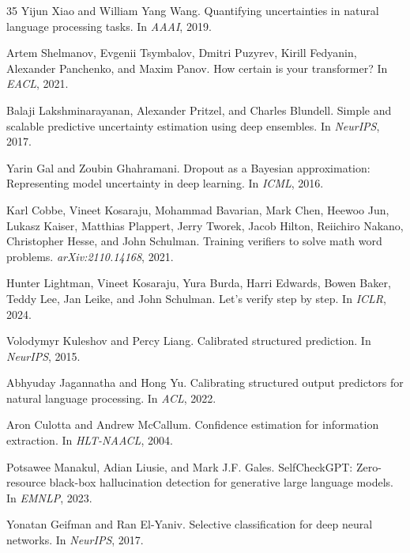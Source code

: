 \documentclass[11pt]{article}
\begin{document}
\begin{thebibliography}{35}
Yijun Xiao and William Yang Wang.
Quantifying uncertainties in natural language processing tasks.
In \emph{AAAI}, 2019.

Artem Shelmanov, Evgenii Tsymbalov, Dmitri Puzyrev, Kirill Fedyanin, Alexander Panchenko, and Maxim Panov.
How certain is your transformer?
In \emph{EACL}, 2021.

Balaji Lakshminarayanan, Alexander Pritzel, and Charles Blundell.
Simple and scalable predictive uncertainty estimation using deep ensembles.
In \emph{NeurIPS}, 2017.

Yarin Gal and Zoubin Ghahramani.
Dropout as a {B}ayesian approximation: Representing model uncertainty in deep learning.
In \emph{ICML}, 2016.

Karl Cobbe, Vineet Kosaraju, Mohammad Bavarian, Mark Chen, Heewoo Jun, Lukasz Kaiser, Matthias Plappert, Jerry Tworek, Jacob Hilton, Reiichiro Nakano, Christopher Hesse, and John Schulman.
Training verifiers to solve math word problems.
\emph{arXiv:2110.14168}, 2021.

Hunter Lightman, Vineet Kosaraju, Yura Burda, Harri Edwards, Bowen Baker, Teddy Lee, Jan Leike, and John Schulman.
Let's verify step by step.
In \emph{ICLR}, 2024.

Volodymyr Kuleshov and Percy Liang.
Calibrated structured prediction.
In \emph{NeurIPS}, 2015.

Abhyuday Jagannatha and Hong Yu.
Calibrating structured output predictors for natural language processing.
In \emph{ACL}, 2022.

Aron Culotta and Andrew McCallum.
Confidence estimation for information extraction.
In \emph{HLT-NAACL}, 2004.

Potsawee Manakul, Adian Liusie, and Mark J.F. Gales.
{S}elf{C}heck{GPT}: Zero-resource black-box hallucination detection for generative large language models.
In \emph{EMNLP}, 2023.

Yonatan Geifman and Ran El-Yaniv.
Selective classification for deep neural networks.
In \emph{NeurIPS}, 2017.


\end{thebibliography}
\end{document}
